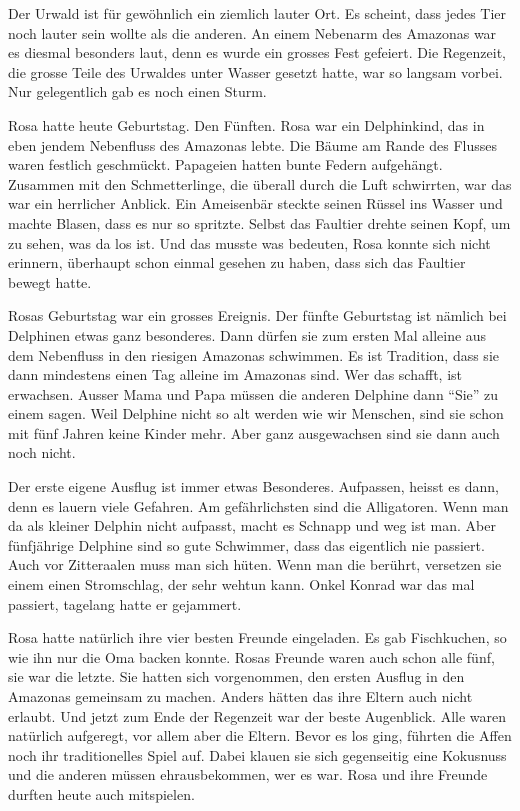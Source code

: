 Der Urwald ist für gewöhnlich ein ziemlich lauter Ort. Es scheint, dass jedes Tier noch lauter sein wollte als die anderen. An einem Nebenarm des Amazonas war es diesmal besonders laut, denn es wurde ein grosses Fest gefeiert. Die Regenzeit, die grosse Teile des Urwaldes unter Wasser gesetzt hatte, war so langsam vorbei. Nur gelegentlich gab es noch einen Sturm. 

Rosa hatte heute Geburtstag. Den Fünften. Rosa war ein Delphinkind, das in eben jendem Nebenfluss des Amazonas lebte. Die Bäume am Rande des Flusses waren festlich geschmückt. Papageien hatten bunte Federn aufgehängt. Zusammen mit den Schmetterlinge, die überall durch die Luft schwirrten, war das war ein herrlicher Anblick. Ein Ameisenbär steckte seinen Rüssel ins Wasser und machte Blasen, dass es nur so spritzte. Selbst das Faultier drehte seinen Kopf, um zu sehen, was da los ist. Und das musste was bedeuten, Rosa konnte sich nicht erinnern, überhaupt schon einmal gesehen zu haben, dass sich das Faultier bewegt hatte.

Rosas Geburtstag war ein grosses Ereignis. Der fünfte Geburtstag ist nämlich bei Delphinen etwas ganz besonderes. Dann dürfen sie zum ersten Mal alleine aus dem Nebenfluss in den riesigen Amazonas schwimmen. Es ist Tradition, dass sie dann mindestens einen Tag alleine im Amazonas sind. Wer das schafft, ist erwachsen. Ausser Mama und Papa müssen die anderen Delphine dann \enquote{Sie} zu einem sagen. Weil Delphine nicht so alt werden wie wir Menschen, sind sie schon mit fünf Jahren keine Kinder mehr. Aber ganz ausgewachsen sind sie dann auch noch nicht.

Der erste eigene Ausflug ist immer etwas Besonderes. Aufpassen, heisst es dann, denn es lauern viele Gefahren. Am gefährlichsten sind die Alligatoren. Wenn man da als kleiner Delphin nicht aufpasst, macht es Schnapp und weg ist man. Aber fünfjährige Delphine sind so gute Schwimmer, dass das eigentlich nie passiert. Auch vor Zitteraalen muss man sich hüten. Wenn man die berührt, versetzen sie einem einen Stromschlag, der sehr wehtun kann. Onkel Konrad war das mal passiert, tagelang hatte er gejammert.

Rosa hatte natürlich ihre vier besten Freunde eingeladen. Es gab Fischkuchen, so wie ihn nur die Oma backen konnte. Rosas Freunde waren auch schon alle fünf, sie war die letzte. Sie hatten sich vorgenommen, den ersten Ausflug in den Amazonas gemeinsam zu machen. Anders hätten das ihre Eltern auch nicht erlaubt. Und jetzt zum Ende der Regenzeit war der beste Augenblick. Alle waren natürlich aufgeregt, vor allem aber die Eltern. Bevor es los ging, führten die Affen noch ihr traditionelles Spiel auf. Dabei klauen sie sich gegenseitig eine Kokusnuss und die anderen müssen ehrausbekommen, wer es war. Rosa und ihre Freunde durften heute auch mitspielen.


